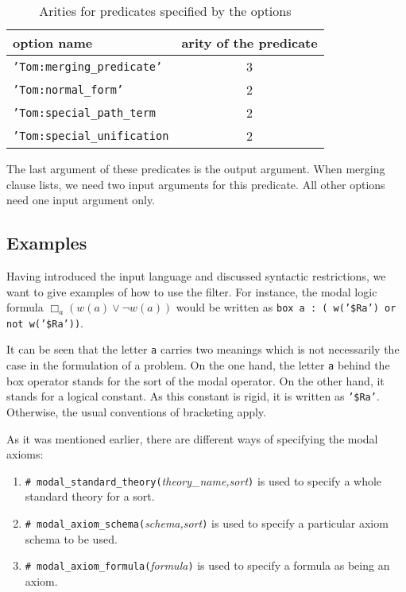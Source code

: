 \makevertother
\begin{table}[htp]
\begin{center}
\begin{tabular}{l|c}
option name & arity of the predicate \\ \hline
{\tt 'Tom:merging\_predicate'} & 3 \\
{\tt 'Tom:normal\_form'} & 2 \\
{\tt 'Tom:special\_path\_term} & 2 \\
{\tt 'Tom:special\_unification} & 2
\end{tabular}
\end{center}
\caption{\label{table:predicate.arities} Arities for predicates specified by
the options}
\end{table}
\makevertactive

The last argument of these predicates is the output argument. When merging
clause lists, we need two input arguments for this predicate. All other
options need one input argument only.

\subsection*{Examples}

Having introduced the input language and discussed syntactic restrictions,
we want to give examples of how to use the filter. For instance, the
modal logic formula \(\Box_a (w(a) \vee \neg w(a))\) would be written as
{\tt box a : ( w('\$Ra') or not w('\$Ra'))}. 

It can be seen that the letter {\tt a} carries two meanings which is not
necessarily the case in the formulation of a problem. On the one hand,
the letter {\tt a} behind the box operator stands for the sort of the modal
operator. On the other hand, it stands for a logical constant. As this constant
is rigid, it is written as {\tt '\$Ra'}. Otherwise, the usual conventions of
bracketing apply.

As it was mentioned earlier, there are different ways of specifying the modal
axioms:

\begin{enumerate}
\item {\tt \# modal\_standard\_theory(}{\em theory\_name,sort}\/{\tt )}
      is used to specify a whole standard theory for a sort.

\item {\tt \# modal\_axiom\_schema(}{\em schema,sort}\/{\tt )} is used to
      specify a particular axiom schema to be used.

\item {\tt \# modal\_axiom\_formula(}{\em formula}\/{\tt )} is used to specify
      a formula as being an axiom.

\end{enumerate}

